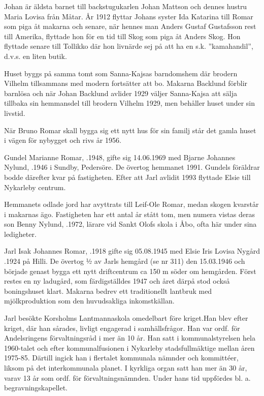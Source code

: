 Johan är äldsta barnet till backstugukarlen Johan Mattson och dennes hustru Maria Lovisa från Måtar. År 1912 flyttar Johans syster Ida Katarina till Romar som piga åt makarna och senare, när hennes man Anders Gustaf Gustafsson rest till Amerika, flyttade hon för en tid
till Skog som piga åt Anders Skog. Hon flyttade senare till Tollikko där hon livnärde sej på att ha en s.k. ”kamahandil”, d.v.s. en liten butik.

Huset byggs på samma tomt som Sanna-Kajsas barndomshem där brodern Vilhelm tillsammans med modern fortsätter att bo. Makarna Backlund förblir barnlösa och när Johan Backlund avlider 1929 väljer Sanna-Kajsa att sälja tillbaka sin hemmansdel till brodern Vilhelm 1929, men behåller huset under sin livstid.

När Bruno Romar skall bygga sig ett nytt hus för sin familj står det gamla huset i vägen för nybygget och rivs år 1956.




Gundel Marianne Romar, .1948, gifte sig 14.06.1969 med Bjarne Johannes Nylund, .1946 i Sundby, Pedersöre. De övertog hemmanet 1991. Gundels föräldrar bodde därefter kvar på fastigheten. Efter att Jarl avlidit 1993 flyttade Elsie till Nykarleby centrum.

Hemmanets odlade jord har avyttrats till Leif-Ole Romar, medan skogen kvarstår i makarnas ägo. Fastigheten har ett antal år stått tom, men numera vistas deras son Benny Nylund, .1972, lärare vid Sankt Olofs skola i  Åbo, ofta här under sina ledigheter.





Jarl Isak Johannes Romar, .1918 gifte sig 05.08.1945 med Elsie Iris Lovisa Nygård .1924 på Hilli. De övertog ½ av Jarls hemgård (se nr 311) den 15.03.1946 och började genast bygga ett nytt driftcentrum ca 150 m söder om hemgården. Först restes en ny ladugård, som färdigställdes 1947 och året därpå stod också boningshuset klart. Makarna bedrev ett traditionellt lantbruk med mjölkproduktion som den huvudsakliga inkomstkällan.

Jarl besökte Korsholms Lantmannaskola omedelbart före kriget.Han blev efter kriget, där han sårades, livligt engagerad i samhällsfrågor. Han var ordf. för Andelsringens förvaltningsråd i mer än 10 år. Han satt i kommunalstyrelsen hela 1960-talet och efter kommunalfusionen i Nykarleby stadsfullmäktige mellan åren 1975-85. Därtill ingick han i flertalet kommunala nämnder och kommittéer, liksom på det interkommunala planet. I kyrkliga organ satt han mer än 30 år, varav  13 år som ordf. för förvaltningsnämnden. Under hans tid uppfördes bl. a. begravningskapellet.

